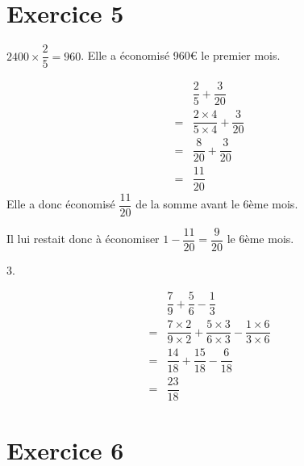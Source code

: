 \section*{Exercice 5}

\begin{enumerate}
    \begin{minipage}{0.45\textwidth}
        \item {} $2400\times\dfrac{2}{5}=960$. Elle a économisé 960€ le premier mois.
        \item {} \begin{align*}
            &\dfrac{2}{5}+\dfrac{3}{20}\\
            =&\dfrac{2\times4}{5\times4}+\dfrac{3}{20}\\
            =&\dfrac{8}{20}+\dfrac{3}{20}\\
            =&\dfrac{11}{20}
        \end{align*}
        Elle a donc économisé $\dfrac{11}{20}$ de la somme avant le 6ème mois. 
    
        Il lui restait donc à économiser $1-\dfrac{11}{20}=\dfrac{9}{20}$ le 6ème mois.
    \end{minipage}
    \hfil\vrule\hfil
    \begin{minipage}{0.45\textwidth}
        3. 
        
        \begin{align*}
            &\dfrac{7}{9}+\dfrac{5}{6}-\dfrac{1}{3}\\
            =&\dfrac{7\times2}{9\times2}+\dfrac{5\times3}{6\times3}-\dfrac{1\times6}{3\times6}\\
            =&\dfrac{14}{18}+\dfrac{15}{18}-\dfrac{6}{18}\\
            =&\dfrac{23}{18}
        \end{align*}
    \end{minipage}
\end{enumerate}
\section*{Exercice 6}

\renewcommand{\ax}{-1}
\renewcommand{\ay}{5}
\renewcommand{\bx}{3}
\renewcommand{\by}{7}
\renewcommand{\cx}{2}
\renewcommand{\cy}{1}
\renewcommand{\dx}{-7}
\renewcommand{\dy}{2}

